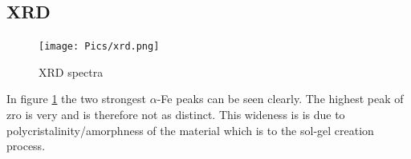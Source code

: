 
\subsection{XRD}
\begin{figure}
	\centering
	\texttt{[image: Pics/xrd.png]}
	\caption{XRD spectra}
	\label{fig:xrd}
\end{figure}

In figure \ref{fig:xrd} the two strongest $\alpha$-Fe peaks can be seen clearly. 
The highest peak of \gls{zro} is very  and is therefore not as distinct. 
This wideness is is due to polycristalinity/amorphness of the material which is  to the sol-gel creation process. 

